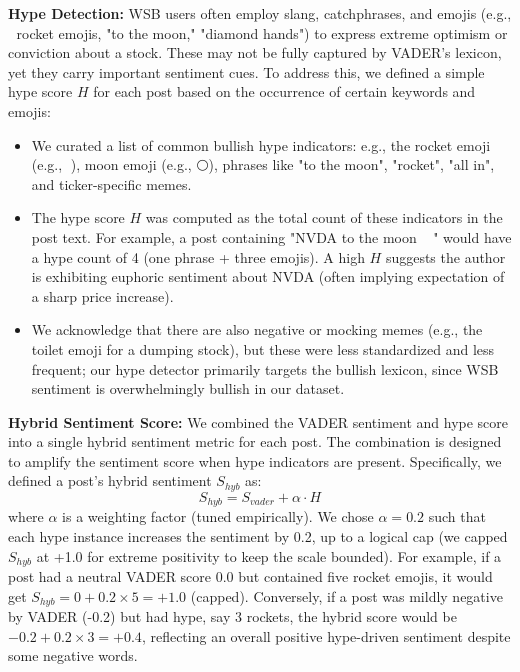 \documentclass[conference]{IEEEtran}
\begin{document}
\textbf{Hype Detection:} WSB users often employ slang, catchphrases, and emojis (e.g., {\emojifont 🚀} rocket emojis, "to the moon," "diamond hands") to express extreme optimism or conviction about a stock. These may not be fully captured by VADER’s lexicon, yet they carry important sentiment cues. To address this, we defined a simple hype score $H$ for each post based on the occurrence of certain keywords and emojis:
\begin{itemize}
	\item We curated a list of common bullish hype indicators: e.g., the rocket emoji (e.g., {\emojifont 🚀}), moon emoji (e.g., {\emojifont 🌕}), phrases like "to the moon", "rocket", "all in", and ticker-specific memes.
	\item The hype score $H$ was computed as the total count of these indicators in the post text. For example, a post containing "NVDA to the moon {\emojifont 🚀}{\emojifont 🚀}{\emojifont 🚀}" would have a hype count of 4 (one phrase + three emojis). A high $H$ suggests the author is exhibiting euphoric sentiment about NVDA (often implying expectation of a sharp price increase).
	\item We acknowledge that there are also negative or mocking memes (e.g., the toilet emoji for a dumping stock), but these were less standardized and less frequent; our hype detector primarily targets the bullish lexicon, since WSB sentiment is overwhelmingly bullish in our dataset.
\end{itemize}

\textbf{Hybrid Sentiment Score:} We combined the VADER sentiment and hype score into a single hybrid sentiment metric for each post. The combination is designed to amplify the sentiment score when hype indicators are present. Specifically, we defined a post’s hybrid sentiment $S_{hyb}$ as:
\begin{equation}
	S_{hyb} = S_{vader} + \alpha \cdot H
\end{equation}
where $\alpha$ is a weighting factor (tuned empirically). We chose $\alpha = 0.2$ such that each hype instance increases the sentiment by 0.2, up to a logical cap (we capped $S_{hyb}$ at +1.0 for extreme positivity to keep the scale bounded). For example, if a post had a neutral VADER score 0.0 but contained five rocket emojis, it would get $S_{hyb} = 0 + 0.2 \times 5 = +1.0$ (capped). Conversely, if a post was mildly negative by VADER (-0.2) but had hype, say 3 rockets, the hybrid score would be $-0.2 + 0.2 \times 3 = +0.4$, reflecting an overall positive hype-driven sentiment despite some negative words.
\end{document}
